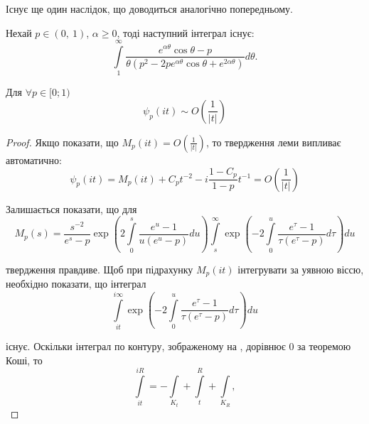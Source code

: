 Існує ще один наслідок, що доводиться аналогічно попередньому. 
\begin{corollary}
	\label{lem:trig_exp_bound}
	Нехай $p \in (0,~1)$, $\alpha \geq 0$, тоді наступний інтеграл існує:
	\begin{equation*}
	\int\limits_{1}^{\infty} \frac{e^{\alpha\theta}\cos \theta - p}{\theta(p^2 - 2pe^{\alpha\theta}\cos\theta + e^{2\alpha\theta})} d \theta.
	\end{equation*}
\end{corollary}

\begin{lem}
Для $\forall p \in [0; 1)$
\begin{equation}
\psi_{p}(it) \sim O\left(\frac{1}{|t|}\right)
\end{equation}
\begin{proof}
Якщо показати, що $M_{p}(it) = O\left(\frac{1}{|t|}\right)$, то твердження леми випливає автоматично:
\begin{equation*}
\psi_{p}(it)=M_{p}(it) + C_{p} t^{-2} - i \frac{1-C_{p}}{1 - p} t^{-1} = O\left(\frac{1}{|t|}\right)
\end{equation*}

Залишається показати, що для
\begin{equation*}
M_{p}(s) = \frac{s^{-2}}{e^s-p} \exp \left(2 \int\limits_{0}^{s} \frac{e^u -1}{u(e^u - p)} du\right) \int\limits_s^\infty \exp\left(-2 \int\limits_{0}^{u} \frac{e^\tau -1}{\tau(e^\tau - p)} d\tau\right) du 
\end{equation*}

твердження правдиве. Щоб при підрахунку $M_{p}(it)$ інтегрувати за уявною віссю, необхідно показати, що інтеграл
\begin{equation*}
\int\limits_{it}^{i\infty} \exp\left(-2 \int\limits_{0}^{u} \frac{e^\tau -1}{\tau(e^\tau - p)} d\tau\right) du 
\end{equation*}

існує. Оскільки інтеграл по контуру, зображеному на , дорівнює 0 за теоремою Коші, то
\begin{equation*}
\int\limits_{it}^{iR} = -\int\limits_{K_{t}} + \int\limits_{t}^{R} + \int\limits_{K_{R}},
\end{equation*}


\end{proof}
\end{lem}
